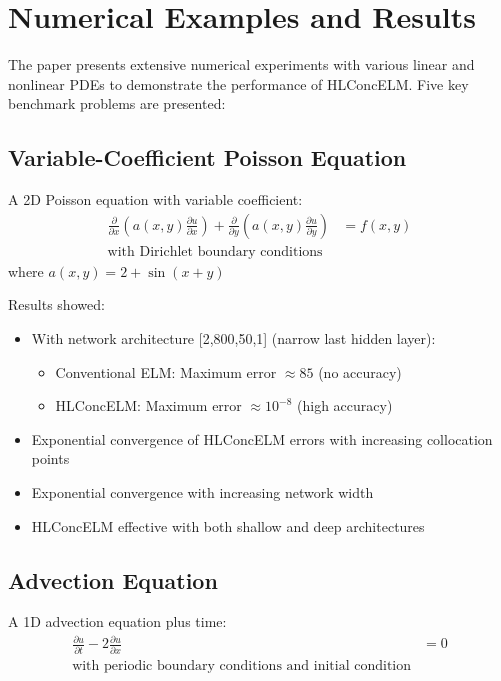 \documentclass[11pt,a4paper]{article}
\begin{document}
\section{Numerical Examples and Results}

The paper presents extensive numerical experiments with various linear and nonlinear PDEs to demonstrate the performance of HLConcELM. Five key benchmark problems are presented:

\subsection{Variable-Coefficient Poisson Equation}

A 2D Poisson equation with variable coefficient:
\begin{align}
\frac{\partial}{\partial x}\left(a(x,y)\frac{\partial u}{\partial x}\right) + \frac{\partial}{\partial y}\left(a(x,y)\frac{\partial u}{\partial y}\right) &= f(x,y) \\
\text{with Dirichlet boundary conditions}
\end{align}
where $a(x,y) = 2 + \sin(x+y)$

Results showed:
\begin{itemize}
    \item With network architecture [2,800,50,1] (narrow last hidden layer):
        \begin{itemize}
            \item Conventional ELM: Maximum error $\approx 85$ (no accuracy)
            \item HLConcELM: Maximum error $\approx 10^{-8}$ (high accuracy)
        \end{itemize}
    \item Exponential convergence of HLConcELM errors with increasing collocation points
    \item Exponential convergence with increasing network width
    \item HLConcELM effective with both shallow and deep architectures
\end{itemize}

\subsection{Advection Equation}

A 1D advection equation plus time:
\begin{align}
\frac{\partial u}{\partial t} - 2\frac{\partial u}{\partial x} &= 0 \\
\text{with periodic boundary conditions and initial condition}
\end{align}
\end{document}

